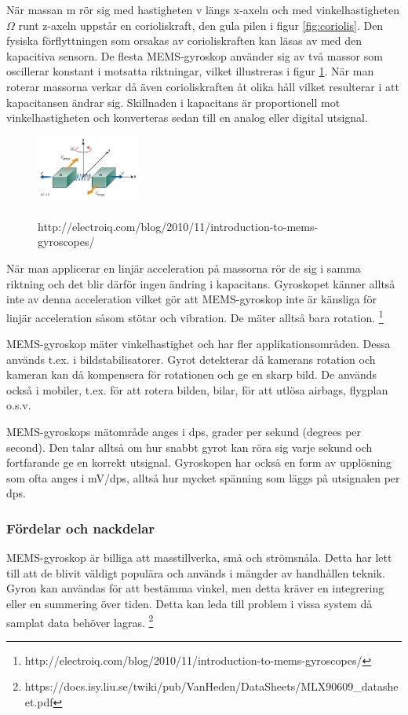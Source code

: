 \documentclass[a4paper,12pt,fleqn]{article}
\begin{document}
När massan m rör sig med hastigheten v längs x-axeln och med vinkelhastigheten $\Omega$ runt z-axeln uppstår en corioliskraft, den gula pilen i figur \ref{fig:coriolis}. Den fysiska förflyttningen som orsakas av corioliskraften kan läsas av med den kapacitiva sensorn. De flesta MEMS-gyroskop använder sig av två massor som oscillerar konstant i motsatta riktningar, vilket illustreras i figur \ref{fig:angular}. När man roterar massorna verkar då även corioliskraften åt olika håll vilket resulterar i att kapacitansen ändrar sig. Skillnaden i kapacitans är proportionell mot vinkelhastigheten och konverteras sedan till en analog eller digital utsignal.

\begin{figure}[h]
\begin{center}
\caption{\\http://electroiq.com/blog/2010/11/introduction-to-mems-gyroscopes/}
\label{fig:angular}
\includegraphics[width=0.3\textwidth]
{angularv.png}
\end{center}
\end{figure}


När man applicerar en linjär acceleration på massorna rör de sig i samma riktning och det blir därför ingen ändring i kapacitans. Gyroskopet känner alltså inte av denna acceleration vilket gör att MEMS-gyroskop inte är känsliga för linjär acceleration såsom stötar och vibration. De mäter alltså bara rotation.
\footnote{http://electroiq.com/blog/2010/11/introduction-to-mems-gyroscopes/}


MEMS-gyroskop mäter vinkelhastighet och har fler applikationsområden. Dessa används t.ex. i bildstabilisatorer. Gyrot detekterar då kamerans rotation och kameran kan då kompensera för rotationen och ge en skarp bild. De används också i mobiler, t.ex. för att rotera bilden, bilar, för att utlösa airbags, flygplan o.s.v.

MEMS-gyroskops mätområde anges i dps, grader per sekund (degrees per second). Den talar alltså om hur snabbt gyrot kan röra sig varje sekund och fortfarande ge en korrekt utsignal. Gyroskopen har också en form av upplösning som ofta anges i mV/dps, alltså hur mycket spänning som läggs på utsignalen per dps.

\subsubsection{Fördelar och nackdelar}
MEMS-gyroskop är billiga att masstillverka, små och strömsnåla. Detta har lett till att de blivit väldigt populära och används i mängder av handhållen teknik.
Gyron kan användas för att bestämma vinkel, men detta kräver en integrering eller en summering över tiden. Detta kan leda till problem i vissa system då samplat data behöver lagras.
\footnote{https://docs.isy.liu.se/twiki/pub/VanHeden/DataSheets/MLX90609_datasheet.pdf}
\end{document}
